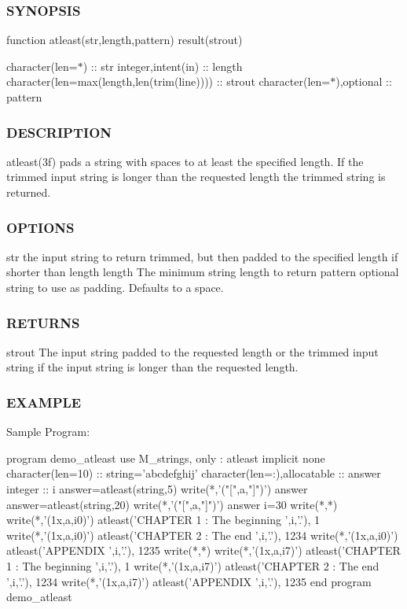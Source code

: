 \subsubsection*{S\+Y\+N\+O\+P\+S\+IS}

function atleast(str,length,pattern) result(strout)

character(len=$\ast$) \+:\+: str integer,intent(in) \+:\+: length character(len=max(length,len(trim(line)))) \+:\+: strout character(len=$\ast$),optional \+:\+: pattern \subsubsection*{D\+E\+S\+C\+R\+I\+P\+T\+I\+ON}

atleast(3f) pads a string with spaces to at least the specified length. If the trimmed input string is longer than the requested length the trimmed string is returned. \subsubsection*{O\+P\+T\+I\+O\+NS}

str the input string to return trimmed, but then padded to the specified length if shorter than length length The minimum string length to return pattern optional string to use as padding. Defaults to a space. \subsubsection*{R\+E\+T\+U\+R\+NS}

strout The input string padded to the requested length or the trimmed input string if the input string is longer than the requested length.

\subsubsection*{E\+X\+A\+M\+P\+LE}

Sample Program\+: \begin{DoxyVerb}program demo_atleast
 use M_strings, only : atleast
 implicit none
 character(len=10)            :: string='abcdefghij'
 character(len=:),allocatable :: answer
 integer                      :: i
    answer=atleast(string,5)
    write(*,'("[",a,"]")') answer
    answer=atleast(string,20)
    write(*,'("[",a,"]")') answer
    i=30
    write(*,*)
    write(*,'(1x,a,i0)') atleast('CHAPTER 1 : The beginning ',i,'.'), 1
    write(*,'(1x,a,i0)') atleast('CHAPTER 2 : The end ',i,'.'),       1234
    write(*,'(1x,a,i0)') atleast('APPENDIX ',i,'.'),                  1235
    write(*,*)
    write(*,'(1x,a,i7)') atleast('CHAPTER 1 : The beginning ',i,'.'), 1
    write(*,'(1x,a,i7)') atleast('CHAPTER 2 : The end ',i,'.'),       1234
    write(*,'(1x,a,i7)') atleast('APPENDIX ',i,'.'),                  1235
end program demo_atleast
\end{DoxyVerb}


